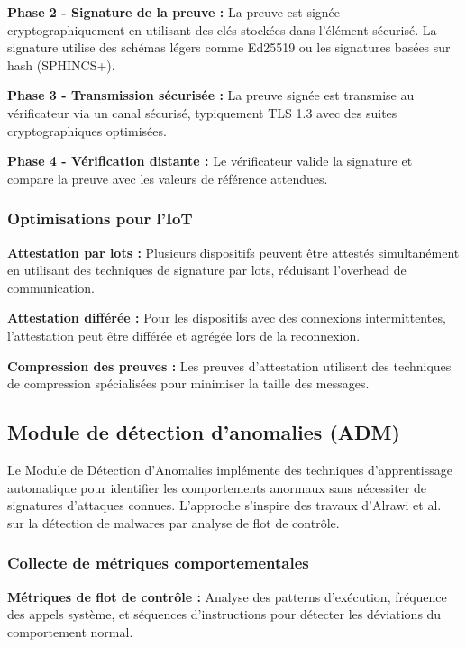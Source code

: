 \textbf{Phase 2 - Signature de la preuve :} La preuve est signée cryptographiquement en utilisant des clés stockées dans l'élément sécurisé. La signature utilise des schémas légers comme Ed25519 ou les signatures basées sur hash (SPHINCS+).

\textbf{Phase 3 - Transmission sécurisée :} La preuve signée est transmise au vérificateur via un canal sécurisé, typiquement TLS 1.3 avec des suites cryptographiques optimisées.

\textbf{Phase 4 - Vérification distante :} Le vérificateur valide la signature et compare la preuve avec les valeurs de référence attendues.

\subsubsection{Optimisations pour l'IoT}

\textbf{Attestation par lots :} Plusieurs dispositifs peuvent être attestés simultanément en utilisant des techniques de signature par lots, réduisant l'overhead de communication.

\textbf{Attestation différée :} Pour les dispositifs avec des connexions intermittentes, l'attestation peut être différée et agrégée lors de la reconnexion.

\textbf{Compression des preuves :} Les preuves d'attestation utilisent des techniques de compression spécialisées pour minimiser la taille des messages.

\subsection{Module de détection d'anomalies (ADM)}

Le Module de Détection d'Anomalies implémente des techniques d'apprentissage automatique pour identifier les comportements anormaux sans nécessiter de signatures d'attaques connues. L'approche s'inspire des travaux d'Alrawi et al. \cite{Alrawi2023MachineLearning} sur la détection de malwares par analyse de flot de contrôle.

\subsubsection{Collecte de métriques comportementales}

\textbf{Métriques de flot de contrôle :} Analyse des patterns d'exécution, fréquence des appels système, et séquences d'instructions pour détecter les déviations du comportement normal.

